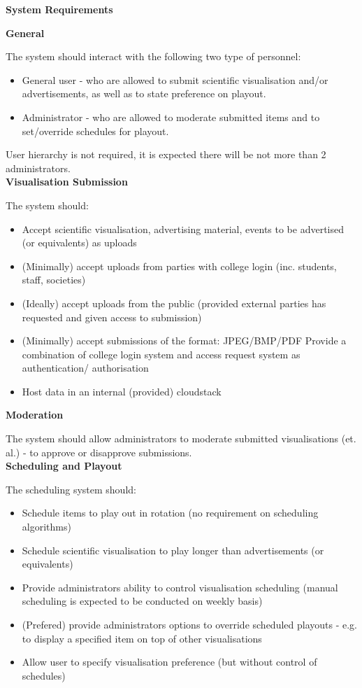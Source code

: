 \documentclass[a4paper, titlepage]{article}
\begin{document}
\textbf{\Large System Requirements} \vspace{5pt}

\textbf{\large General}

The system should interact with the following two type of personnel:

\begin{itemize}
  \item General user - who are allowed to submit scientific visualisation and/or advertisements, as well as to state preference on playout.
  \item Administrator - who are allowed to moderate submitted items and to set/override schedules for playout.
\end{itemize}

User hierarchy is not required, it is expected there will be not more than 2 administrators.\\

\textbf{\large Visualisation Submission}

The system should:

\begin{itemize}
\item Accept scientific visualisation, advertising material, events to be advertised (or equivalents) as uploads
\item (Minimally) accept uploads from parties with college login (inc. students, staff, societies)
\item (Ideally) accept uploads from the public (provided external parties has requested and given access to submission)
\item (Minimally) accept submissions of the format: JPEG/BMP/PDF Provide a combination of college login system and access request system as authentication/ authorisation
\item Host data in an internal (provided) cloudstack\\
\end{itemize}

\textbf{\large Moderation}

The system should allow administrators to moderate submitted visualisations (et. al.) - to approve or disapprove submissions.\\

\textbf{\large Scheduling and Playout}

The scheduling system should:

\begin{itemize}
\item Schedule items to play out in rotation (no requirement on scheduling algorithms)
\item Schedule scientific visualisation to play longer than advertisements (or equivalents)
\item Provide administrators ability to control visualisation scheduling (manual scheduling is expected to be conducted on weekly basis)
\item (Prefered) provide administrators options to override scheduled playouts - e.g. to display a specified item on top of other visualisations
\item Allow user to specify visualisation preference (but without control of schedules)
\end{itemize}
\end{document}
